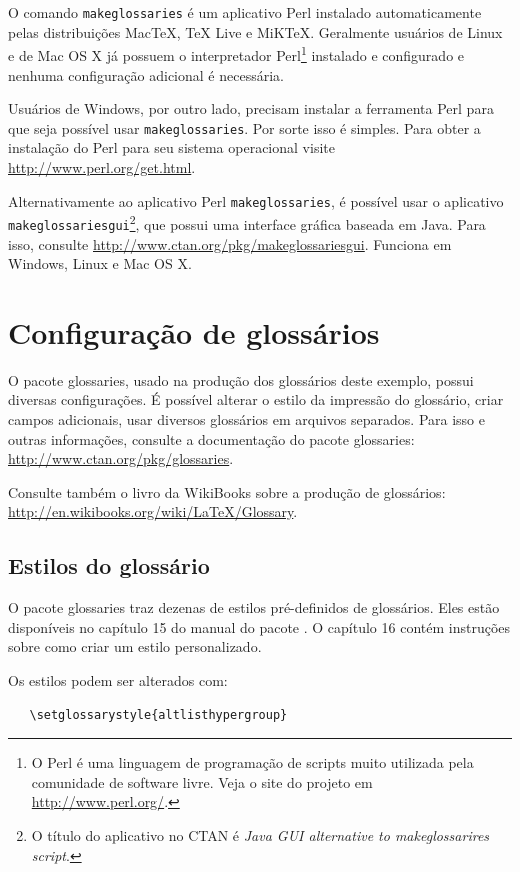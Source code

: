 O comando \texttt{makeglossaries} é um aplicativo Perl instalado
automaticamente pelas distribuições MacTeX, TeX Live e MiKTeX. Geralmente
usuários de Linux e de Mac OS X já possuem o interpretador Perl\footnote{O Perl
é uma linguagem de programação de scripts muito utilizada pela comunidade de
software livre. Veja o site do projeto em \url{http://www.perl.org/}.} instalado
e configurado e nenhuma configuração adicional é necessária.

Usuários de Windows, por outro lado, precisam instalar a ferramenta Perl para
que seja possível usar \texttt{makeglossaries}. Por sorte isso é simples. Para
obter a instalação do Perl para seu sistema operacional visite \url{http://www.perl.org/get.html}.

Alternativamente ao aplicativo Perl \texttt{makeglossaries}, é possível usar o
aplicativo \texttt{makeglossariesgui}\footnote{O título do aplicativo no CTAN
é \textit{Java GUI alternative to makeglossarires script}.}, que possui uma
interface gráfica baseada em Java. Para isso, consulte
\url{http://www.ctan.org/pkg/makeglossariesgui}. Funciona em Windows,
Linux e Mac OS X.

\section{Configuração de glossários}

O pacote \textsf{glossaries}, usado na produção dos glossários deste exemplo,
possui diversas configurações. É possível alterar o estilo da impressão do
glossário, criar campos adicionais, usar diversos glossários em
arquivos separados. Para isso e outras informações, consulte a documentação do
pacote \textsf{glossaries}: \url{http://www.ctan.org/pkg/glossaries}.

Consulte também o livro da WikiBooks sobre a produção de glossários:
\url{http://en.wikibooks.org/wiki/LaTeX/Glossary}.
 

\subsection{Estilos do glossário}

O pacote \textsf{glossaries} traz dezenas de estilos pré-definidos de
glossários. Eles estão disponíveis no capítulo 15 do manual do pacote
\cite{talbot2012}. O capítulo 16 contém instruções sobre como criar um estilo
personalizado.

Os estilos podem ser alterados com:
\begin{verbatim}
   \setglossarystyle{altlisthypergroup}
\end{verbatim}

